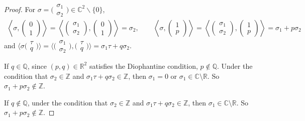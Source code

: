 \documentclass[10pt,a4paper]{amsart}
\numberwithin{equation}{section}
\begin{document}
\begin{proof}
For $\sigma =\bigl(\begin{smallmatrix}\sigma_1\\\sigma_2\end{smallmatrix}\bigr) \in \mathbb{C}^2 \backslash \{ 0 \}$,
\begin{gather*}
\left\langle \sigma,\begin{pmatrix}0 \\1\end{pmatrix} \right\rangle =\left\langle \begin{pmatrix}\sigma_1\\
\sigma_2\end{pmatrix}, \begin{pmatrix}0 \\1\end{pmatrix} \right\rangle =\sigma_2, \qquad \left\langle \sigma,\begin{pmatrix}1 \\p\end{pmatrix} \right\rangle=\left\langle \begin{pmatrix}\sigma_1\\
\sigma_2\end{pmatrix}, \begin{pmatrix} 1 \\p \end{pmatrix} \right\rangle =\sigma_1+p\sigma_2
\end{gather*}
and $\bigl\langle \sigma\bigl(\begin{smallmatrix}\tau \\q\end{smallmatrix}\bigr) \bigr\rangle =\bigl\langle \bigl(\begin{smallmatrix}\sigma_1\\
\sigma_2\end{smallmatrix}\bigr), \bigl(\begin{smallmatrix} \tau \\ q \end{smallmatrix}\bigr) \bigr\rangle =\sigma_1 \tau+q\sigma_2$.

If $q \in \mathbb{Q}$, since $(p,q) \in \mathbb{R}^2$ satisfies the Diophantine condition, $p \notin \mathbb{Q}$. Under the condition that $\sigma_2 \in \mathbb{Z}$ and $\sigma_1 \tau + q\sigma_2\in \mathbb{Z}$, then $\sigma_1=0$ or $\sigma_1 \in \mathbb{C} \setminus \mathbb{R}$. So $\sigma_1 + p\sigma_2\notin \mathbb{Z}$.

If $q \notin \mathbb{Q}$, under the condition that $\sigma_2 \in \mathbb{Z}$ and $\sigma_1 \tau + q\sigma_2\in \mathbb{Z}$, then $\sigma_1 \in \mathbb{C} \setminus \mathbb{R}$. So $\sigma_1 + p\sigma_2\notin \mathbb{Z}$.


\end{proof}
\end{document}
